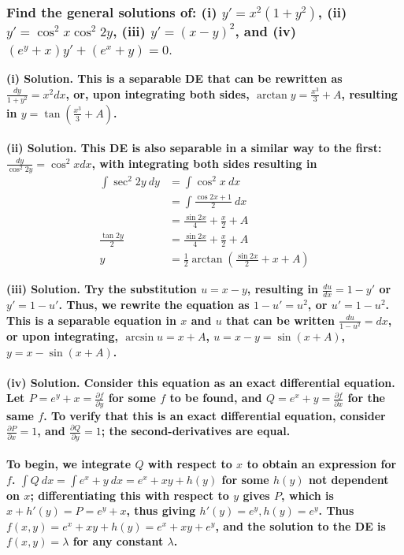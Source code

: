 \documentclass{article}
\begin{document}
\subsubsection*{Find the general solutions of: (i) $y' = x^2(1+y^2)$, (ii) $y'=\cos^2 x \cos^2 2y$, (iii) $y'=(x-y)^2$, and (iv) $(e^y+x)y' + (e^x+y)=0.$}
\bf (i) Solution. \normalfont This is a separable DE that can be rewritten as $\frac{dy}{1+y^2} = x^2 dx$, or, upon integrating both sides, $\arctan y =  \frac{x^3}{3} + A$, resulting in $y = \tan(\frac{x^3}{3} + A)$.
\\
\\
\bf (ii) Solution. \normalfont This DE is also separable in a similar way to the first: $\frac{dy}{\cos^2 2y} = \cos^2 x dx$, with integrating both sides resulting in 
\begin{equation*}
    \begin{aligned}
        \int \sec^2 2y\ dy &= \int \cos^2 x\ dx \\
        &= \int \frac{\cos 2x + 1}{2}\ dx \\
        &= \frac{\sin 2x}{4} + \frac{x}{2} + A \\
        \frac{\tan 2y}{2} &= \frac{\sin 2x}{4} + \frac{x}{2} + A \\
        y &= \frac{1}{2}\arctan (\frac{\sin 2x}{2} + x + A)
    \end{aligned}
\end{equation*}

\bf (iii) Solution. \normalfont Try the substitution $u = x - y$, resulting in $\frac{du}{dx} = 1 - y'$ or $y' = 1-u'$. Thus, we rewrite the equation as $1-u' = u^2$, or $u' = 1-u^2$. This is a separable equation in $x$ and $u$ that can be written $\frac{du}{1-u^2} = dx$, or upon integrating, $\arcsin u = x + A$, $u = x - y = \sin(x + A)$, $y = x - \sin(x+A)$. \\ \\
\bf (iv) Solution. \normalfont Consider this equation as an exact differential equation. Let $P = e^y + x = \frac{\partial f}{\partial y}$ for some $f$ to be found, and $Q = e^x + y = \frac{\partial f}{\partial x}$ for the same $f$. To verify that this is an exact differential equation, consider $\frac{\partial P}{\partial x} = 1$, and $\frac{\partial Q}{\partial y} = 1$; the second-derivatives are equal. \\ \\
To begin, we integrate $Q$ with respect to $x$ to obtain an expression for $f$. $\int Q \ dx = \int e^x + y \ dx = e^x + xy + h(y)$ for some $h(y)$ not dependent on $x$; differentiating this with respect to $y$ gives $P$, which is $x + h'(y) = P = e^y + x$, thus giving $h'(y) = e^y, h(y) = e^y$. Thus $f(x,y) = e^x + xy + h(y) = e^x + xy + e^y$, and the solution to the DE is $f(x,y) = \lambda$ for any constant $\lambda$.
\hrulefill
\end{document}
